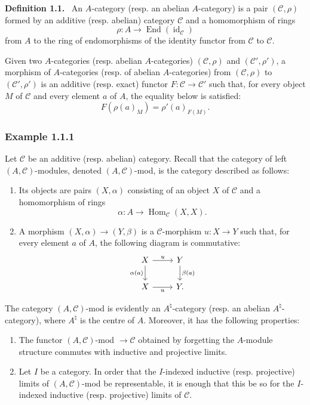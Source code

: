 \documentclass[11pt]{article}
\newenvironment{statement}[1]{\par\medskip\noindent\textbf{#1.}\ }{\par\medskip}
\DeclareMathOperator{\Hom}{Hom}
\providecommand{\id}{\operatorname{id}}
\providecommand{\Hom}{\operatorname{Hom}}
\providecommand{\cC}{\mathcal C}
\providecommand{\End}{\operatorname{End}}
\providecommand{\id}{\operatorname{id}}
\providecommand{\id}{\operatorname{id}}
\providecommand{\End}{\operatorname{End}}
\providecommand{\id}{\operatorname{id}}
\providecommand{\id}{\operatorname{id}}
\providecommand{\cC}{\mathcal C}
\begin{document}
\begin{statement}{Definition 1.1}
An $A$-category (resp. an abelian $A$-category) is a pair $(\cC,\rho)$ formed by an additive (resp. abelian) category $\cC$ and a homomorphism of rings
\[
\rho:A\longrightarrow \End(\id_{\cC})
\]
from $A$ to the ring of endomorphisms of the identity functor from $\cC$ to $\cC$.
\end{statement}

Given two $A$-categories (resp. abelian $A$-categories) $(\cC,\rho)$ and $(\cC',\rho')$, a morphism of $A$-categories (resp. of abelian $A$-categories) from $(\cC,\rho)$ to $(\cC',\rho')$ is an additive (resp. exact) functor $F:\cC\to\cC'$ such that, for every object $M$ of $\cC$ and every element $a$ of $A$, the equality below is satisfied:
\[
F(\rho(a)_M)=\rho'(a)_{F(M)}.
\]

\subsubsection*{Example 1.1.1}
Let $\cC$ be an additive (resp. abelian) category. Recall that the category of left $(A,\cC)$-modules, denoted $(A,\cC)$-mod, is the category described as follows:
\begin{enumerate}[label=(\roman*)]
\item Its objects are pairs $(X,\alpha)$ consisting of an object $X$ of $\cC$ and a homomorphism of rings
\[
\alpha:A\longrightarrow \Hom_{\cC}(X,X).
\]
\item A morphism $(X,\alpha)\to(Y,\beta)$ is a $\cC$-morphism $u:X\to Y$ such that, for every element $a$ of $A$, the following diagram is commutative:
\[
\begin{tikzcd}
X \arrow[r,"u"] \arrow[d,"\alpha(a)"'] & Y \arrow[d,"\beta(a)"]\\
X \arrow[r,"u"'] & Y .
\end{tikzcd}
\]
\end{enumerate}
The category $(A,\cC)$-mod is evidently an $A^{\natural}$-category (resp. an abelian $A^{\natural}$-category), where $A^{\natural}$ is the centre of $A$. Moreover, it has the following properties:
\begin{enumerate}[label=(\alph*)]
\item The functor $(A,\cC)$-mod $\to\cC$ obtained by forgetting the $A$-module structure commutes with inductive and projective limits.
\item Let $I$ be a category. In order that the $I$-indexed inductive (resp. projective) limits of $(A,\cC)$-mod be representable, it is enough that this be so for the $I$-indexed inductive (resp. projective) limits of $\cC$.
\end{enumerate}
\end{document}
